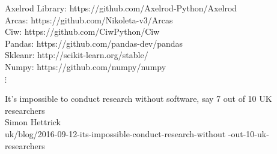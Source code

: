\documentclass{beamer}
\theoremstyle{definition}
\begin{document}
\begin{frame}
\begin{center}
    \small{Axelrod Library: https://github.com/Axelrod-Python/Axelrod} \\
    \vspace{3mm}
    \small{Arcas: https://github.com/Nikoleta-v3/Arcas} \\
    \vspace{3mm}
    \small{Ciw: https://github.com/CiwPython/Ciw} \\
    \vspace{3mm}
    \small{Pandas: https://github.com/pandas-dev/pandas} \\
    \vspace{3mm}
    \small{Skleanr: http://scikit-learn.org/stable/} \\
    \vspace{3mm}
    \small{Numpy: https://github.com/numpy/numpy} \\
    $\vdots$
\end{center}
\end{frame}

\begin{frame}
\begin{center}
\huge{It's impossible to conduct research without software, say 7 out of 10
UK researchers} \\
\vspace{10mm}
\large{Simon Hettrick} \\
\vspace{10mm}
\tiny{uk/blog/2016-09-12-its-impossible-conduct-research-without%
-out-10-uk-researchers}
\end{center}
\end{frame}

\begin{frame}
\begin{center}
   
\end{center}
\end{frame}

\begin{frame}
\begin{center}
    
\end{center}
\end{frame}

\begin{frame}
\begin{center}
    
\end{center}
\end{frame}
\end{document}
